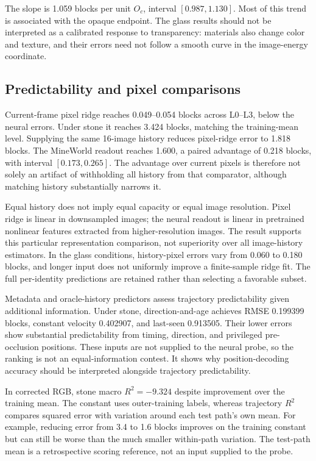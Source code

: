 \documentclass{article}
\begin{document}
The slope is 1.059 blocks per unit $O_c$, interval $[0.987,1.130]$. Most of this trend is associated with the opaque endpoint. The glass results should not be interpreted as a calibrated response to transparency: materials also change color and texture, and their errors need not follow a smooth curve in the image-energy coordinate.


\subsection{Predictability and pixel comparisons}
\label{sec:baseline-results}
Current-frame pixel ridge reaches 0.049--0.054 blocks across L0--L3, below the neural errors. Under stone it reaches 3.424 blocks, matching the training-mean level. Supplying the same 16-image history reduces pixel-ridge error to 1.818 blocks. The MineWorld readout reaches 1.600, a paired advantage of 0.218 blocks, with interval $[0.173,0.265]$. The advantage over current pixels is therefore not solely an artifact of withholding all history from that comparator, although matching history substantially narrows it.

Equal history does not imply equal capacity or equal image resolution. Pixel ridge is linear in downsampled images; the neural readout is linear in pretrained nonlinear features extracted from higher-resolution images. The result supports this particular representation comparison, not superiority over all image-history estimators. In the glass conditions, history-pixel errors vary from 0.060 to 0.180 blocks, and longer input does not uniformly improve a finite-sample ridge fit. The full per-identity predictions are retained rather than selecting a favorable subset.

Metadata and oracle-history predictors assess trajectory predictability given additional information. Under stone, direction-and-age achieves RMSE 0.199399 blocks, constant velocity 0.402907, and last-seen 0.913505. Their lower errors show substantial predictability from timing, direction, and privileged pre-occlusion positions. These inputs are not supplied to the neural probe, so the ranking is not an equal-information contest. It shows why position-decoding accuracy should be interpreted alongside trajectory predictability.

In corrected RGB, stone macro $R^2=-9.324$ despite improvement over the training mean. The constant uses outer-training labels, whereas trajectory $R^2$ compares squared error with variation around each test path's own mean. For example, reducing error from 3.4 to 1.6 blocks improves on the training constant but can still be worse than the much smaller within-path variation. The test-path mean is a retrospective scoring reference, not an input supplied to the probe.
\end{document}

